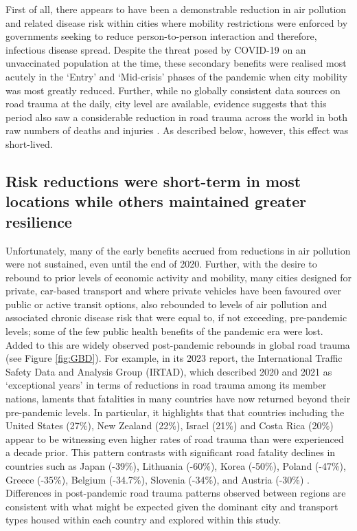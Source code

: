 \documentclass[preprint,10pt]{elsarticle} %
\begin{document}
First of all, there appears to have been a demonstrable reduction in air pollution and related disease risk within cities where mobility restrictions were enforced by governments seeking to reduce person-to-person interaction and therefore, infectious disease spread. Despite the threat posed by COVID-19 on an unvaccinated population at the time, these secondary benefits were realised most acutely in the `Entry' and `Mid-crisis' phases of the pandemic when city mobility was most greatly reduced. Further, while no globally consistent data sources on road trauma at the daily, city level are available, evidence suggests that this period also saw a considerable reduction in road trauma across the world in both raw numbers of deaths and injuries \cite{saladie2023back,ITFRS2022,ITFRS2023,GBDStudy}. As described below, however, this effect was short-lived.

\subsection*{Risk reductions were short-term in most locations while others maintained greater resilience}
Unfortunately, many of the early benefits accrued from reductions in air pollution were not sustained, even until the end of 2020. Further, with the desire to rebound to prior levels of economic activity and mobility, many cities designed for private, car-based transport and where private vehicles have been favoured over public or active transit options\cite{DAS20211}, also rebounded to levels of air pollution and associated chronic disease risk that were equal to, if not exceeding, pre-pandemic levels; some of the few public health benefits of the pandemic era were lost. Added to this are widely observed post-pandemic rebounds in global road trauma (see Figure \ref{fig:GBD}). For example, in its 2023 report, the International Traffic Safety Data and Analysis Group (IRTAD), which described 2020 and 2021 as `exceptional years' in terms of reductions in road trauma among its member nations, laments that fatalities in many countries have now returned beyond their pre-pandemic levels. In particular, it highlights that that countries including the United States (27\%), New Zealand (22\%), Israel (21\%) and Costa Rica (20\%) appear to be witnessing even higher rates of road trauma than were experienced a decade prior. This pattern contrasts with significant road fatality declines in countries such as Japan (-39\%), Lithuania (-60\%), Korea (-50\%), Poland (-47\%), Greece (-35\%), Belgium (-34.7\%), Slovenia (-34\%), and Austria (-30\%) \cite{ITFRS2022,ITFRS2023}. Differences in post-pandemic road trauma patterns observed between regions are consistent with what might be expected given the dominant city and transport types housed within each country and explored within this study.
\end{document}
